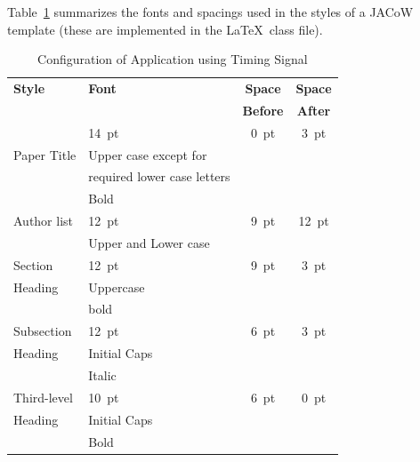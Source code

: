 \documentclass[a4paper,
              ]{jacow}
\begin{document}
Table~\ref{app-conf} summarizes the fonts and spacings used in the styles of
a JACoW template (these are implemented in the \LaTeX\ class file).
\begin{table}[h!t]
    \setlength\tabcolsep{3.8pt}
    \caption{Configuration of Application using Timing Signal}
    \label{app-conf}
    \begin{tabular}{@{}llcc@{}}
        \toprule
        \textbf{Style} & \textbf{Font}               & \textbf{Space}  & \textbf{Space} \\
                       &                             & \textbf{Before} & \textbf{After} \\
        \midrule
                       & \SI{14}{pt}                 & \SI{0}{pt}      & \SI{3}{pt}  \\
          Paper Title  & Upper case except for       &                 &      \\
                       & required lower case letters &                 &      \\   %
                       & Bold                        &                 &      \\
         \midrule
          Author list  & \SI{12}{pt}                 & \SI{9}{pt}      & \SI{12}{pt} \\
                       & Upper and Lower case        &                 &      \\
         \midrule
         Section       & \SI{12}{pt}                 & \SI{9}{pt}      & \SI{3}{pt}  \\
         Heading       & Uppercase                   &                 &      \\
                       & bold                        &                 &      \\
        \midrule
         Subsection    & \SI{12}{pt}                 & \SI{6}{pt}      & \SI{3}{pt}  \\
         Heading       & Initial Caps                &                 &      \\
                       & Italic                      &                 &      \\
        \midrule
         Third-level   & \SI{10}{pt}                 & \SI{6}{pt}           & \SI{0}{pt}  \\
         Heading       & Initial Caps                &                 &      \\
                       & Bold                        &                 &      \\

\end{tabular}
\end{table}
\end{document}
